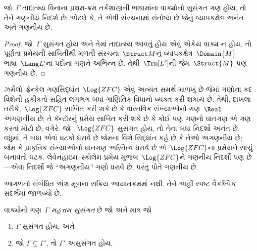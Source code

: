 
\begin{thm}
 જો~$\Gamma$ તાદાત્મ્ય વિનાના પ્રથમ-ક્રમ
તર્કશાસ્ત્રની ભાષામાંના વાક્યોનો સુસંગત ગણ હોય, તો તેને
ગણનીય નિદર્શ છે; એટલે કે, તે એવી સંરચનામાં સંતોષ્ય
છે જેનું વ્યાપકક્ષેત્ર અનંત અને ગણનીય છે.
\end{thm}

\begin{proof}
જો~$\Gamma$ સુસંગત હોય અને તેમાં તાદાત્મ્ય આવતું હોય એવું એકેય વાક્ય
ન હોય, તો પૂર્ણતા પ્રમેયની સાબિતીથી મળતી સંરચના~$\Struct M$નું
વ્યાપકક્ષેત્ર~$\Domain{M}$ ભાષા~$\Lang L'$નાં પદોના ગણને અભિન્ન છે.
તેથી~$\Trm[L']$ની જેમ~$\Struct{M}$ પણ ગણનીય છે.
\end{proof}

\begin{ex}[સ્કોલેમનો વિરોધાભાસ]
ઝર્મેલો--ફ્રેન્કેલ ગણસિદ્ધાંત~$\Log{ZFC}$ એવું અત્યંત સમર્થ માળખું છે
જેમાં ગણોના કદ વિશેની હકીકતો સહિત લગભગ બધાં ગાણિતિક વિધાનો વ્યક્ત કરી
શકાય છે. તેથી, દાખલા તરીકે,~$\Log{ZFC}$ સાબિત કરી શકે છે કે વાસ્તવિક
સંખ્યાઓનો ગણ~$\Real$ અગણનીય છે; તે કૅન્ટૉરનું પ્રમેય સાબિત
કરી શકે છે કે કોઈ પણ ગણનો ઘાતગણ એ ગણ કરતાં મોટો છે; વગેરે. જો
~$\Log{ZFC}$ સુસંગત હોય, તો તેના બધા નિદર્શો અનંત છે. વધુમાં, તે બધા
એવાં ઘટકો ધરાવે છે જેમના વિશે સિદ્ધાંત કહે છે કે તેઓ
અગણનીય છે; જેમ કે પ્રાકૃતિક સંખ્યાઓનો ઘાતગણ અસ્તિત્વ ધરાવે
છે એ~$\Log{ZFC}$ના પ્રમેયને સાચું બનાવતો ઘટક. લેવેનહાઇમ--સ્કોલેમ
પ્રમેય મુજબ~$\Log{ZFC}$ને ગણનીય નિદર્શો પણ છે—એવા નિદર્શો જે
``અગણનીય'' ગણો ધરાવે છે, પરંતુ પોતે ગણનીય છે.
\end{ex}
\endgroup


\OLEndChapterHook


\begin{editorial}
આગળનો સંબંધિત અંશ મૂળના સક્રિય આયાતક્રમમાં નથી. તેને અહીં સ્પષ્ટ વૈકલ્પિક સંદર્ભમાં જાળવ્યો છે.
\end{editorial}
\begingroup
\makeatletter{}\makeatother

\label{guunit:OLP-0644}


\begin{defn}[મહત્તમ સુસંગત ગણ]
વાક્યોનો ગણ~$\Gamma$ \emph{મહત્તમ સુસંગત} છે જો અને માત્ર જો
\begin{enumerate}
\item $\Gamma$ સુસંગત હોય, અને
\item જો $\Gamma \subsetneq \Gamma'$, તો $\Gamma'$ અસુસંગત હોય.
\end{enumerate}
\end{defn}

